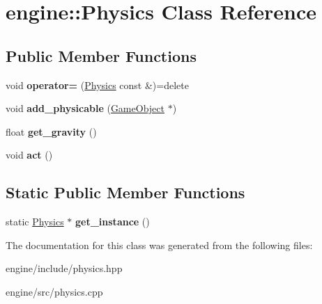 \hypertarget{classengine_1_1_physics}{}\section{engine\+:\+:Physics Class Reference}
\label{classengine_1_1_physics}
\subsection*{Public Member Functions}
\begin{DoxyCompactItemize}
\item 
void {\bfseries operator=} (\hyperlink{classengine_1_1_physics}{Physics} const \&)=delete\hypertarget{classengine_1_1_physics_a28a67fa9177a00fa17cc94235870aac6}{}\label{classengine_1_1_physics_a28a67fa9177a00fa17cc94235870aac6}

\item 
void {\bfseries add\+\_\+physicable} (\hyperlink{classengine_1_1_game_object}{Game\+Object} $\ast$)\hypertarget{classengine_1_1_physics_a3ea90787e9875fd848d60702b4d787b6}{}\label{classengine_1_1_physics_a3ea90787e9875fd848d60702b4d787b6}

\item 
float {\bfseries get\+\_\+gravity} ()\hypertarget{classengine_1_1_physics_a0467d64aa843a48a8af5e5eccc9a4407}{}\label{classengine_1_1_physics_a0467d64aa843a48a8af5e5eccc9a4407}

\item 
void {\bfseries act} ()\hypertarget{classengine_1_1_physics_a715afb08feafa90c9e50b51977825364}{}\label{classengine_1_1_physics_a715afb08feafa90c9e50b51977825364}

\end{DoxyCompactItemize}
\subsection*{Static Public Member Functions}
\begin{DoxyCompactItemize}
\item 
static \hyperlink{classengine_1_1_physics}{Physics} $\ast$ {\bfseries get\+\_\+instance} ()\hypertarget{classengine_1_1_physics_ade5c34703f40c9a395ae4d03b7089f27}{}\label{classengine_1_1_physics_ade5c34703f40c9a395ae4d03b7089f27}

\end{DoxyCompactItemize}


The documentation for this class was generated from the following files\+:\begin{DoxyCompactItemize}
\item 
engine/include/physics.\+hpp\item 
engine/src/physics.\+cpp\end{DoxyCompactItemize}
